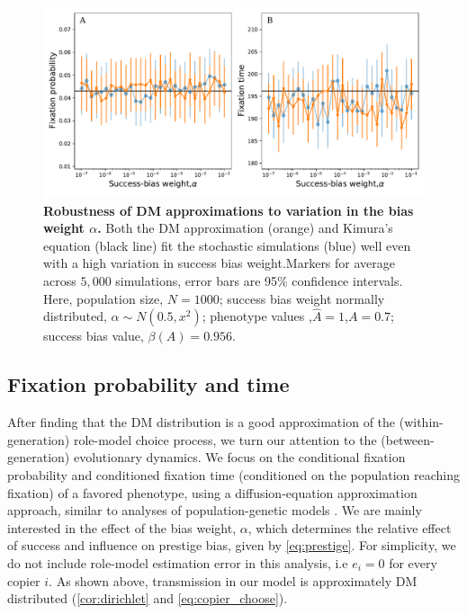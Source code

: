 \documentclass[12pt]{extarticle}
\begin{document}
\begin{figure}
    \includegraphics[width=\linewidth]{../figures/final/full_vs_dm_changing_alpha.pdf}
   \caption{\textbf{Robustness of DM approximations to variation in the bias weight $\alpha$.} 
   Both the DM approximation (orange) and Kimura's equation (black line) fit the stochastic simulations (blue) well even with a high variation in success bias weight.Markers for average across $5,000$ simulations, error bars are 95\% confidence intervals.
  Here, population size, $N=1000$; success bias weight normally distributed, $\alpha\sim N(0.5,x^2)$; phenotype values ,$\hat{A}=1$,$A=0.7$; success bias value, $\beta(A)=0.956$.}	
  \label{fig:hetro_alpha}
\end{figure}


\subsection{Fixation probability and time}

After finding that the DM distribution is a good approximation of the (within-generation) role-model choice process, we turn our attention to the (between-generation) evolutionary dynamics.
We focus on the conditional fixation probability and conditioned fixation time (conditioned on the population reaching fixation) of a favored phenotype, using a diffusion-equation approximation approach, similar to analyses of population-genetic models \citep{kimura,kimura_average,otto_fixation}.
We are mainly interested in the effect of the bias weight, $\alpha$, which determines the relative effect of success and influence on prestige bias, given by \cref{eq:prestige}.
For simplicity, we do not include role-model estimation error in this analysis, i.e $e_i=0$ for every copier $i$.
As shown above, transmission in our model is approximately DM distributed (\cref{cor:dirichlet} and \cref{eq:copier_choose}).
\end{document}
